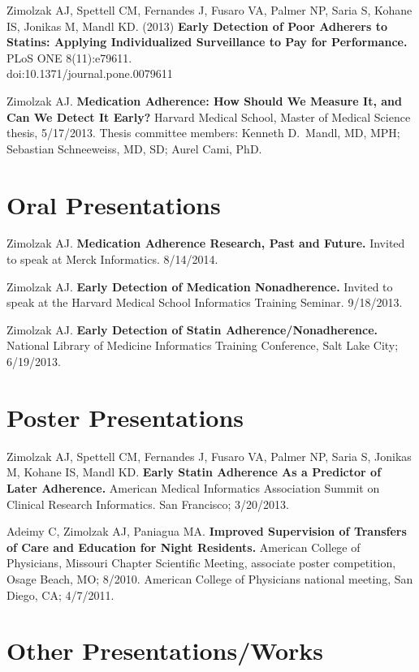 \documentclass[12pt]{article}
\begin{document}
Zimolzak AJ, Spettell CM, Fernandes J, Fusaro VA, Palmer NP, Saria S,
Kohane IS, Jonikas M, Mandl KD. (2013) \textbf{Early Detection of Poor
  Adherers to Statins: Applying Individualized Surveillance to Pay for
  Performance.} PLoS ONE 8(11):e79611. \\
doi:10.1371/journal.pone.0079611

Zimolzak AJ. \textbf{Medication Adherence: How Should We Measure It, and Can
We Detect It Early?} Harvard Medical School, Master of Medical Science
thesis, 5/17/2013. Thesis committee members: Kenneth D.\ Mandl, MD,
MPH; Sebastian Schneeweiss, MD, SD; Aurel Cami, PhD.

\section*{Oral Presentations} %

Zimolzak AJ. \textbf{Medication Adherence Research, Past and Future.}
Invited to speak at Merck Informatics. 8/14/2014.

Zimolzak AJ. \textbf{Early Detection of Medication Nonadherence.}
Invited to speak at the Harvard Medical School Informatics Training
Seminar. 9/18/2013.

Zimolzak AJ. \textbf{Early Detection of Statin
  Adherence/Nonadherence.} National Library of Medicine Informatics
Training Conference, Salt Lake City; 6/19/2013.

\section*{Poster Presentations}

Zimolzak AJ, Spettell CM, Fernandes J, Fusaro VA, Palmer NP, Saria S,
Jonikas M, Kohane IS, Mandl KD. \textbf{Early Statin
  Adherence As a Predictor of Later Adherence.} American Medical
Informatics Association Summit on Clinical Research Informatics. San
Francisco; 3/20/2013.

Adeimy C, Zimolzak AJ, Paniagua MA. \textbf{Improved Supervision of
  Transfers of Care and Education for Night Residents.} American
College of Physicians, Missouri Chapter Scientific Meeting, associate
poster competition, Osage Beach, MO; 8/2010. American College of
Physicians national meeting, San Diego, CA; 4/7/2011.

\section*{Other Presentations/Works}
\end{document}
